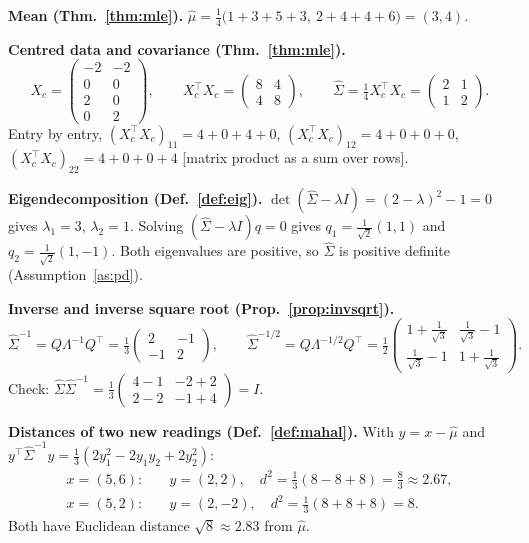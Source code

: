 \documentclass[11pt]{article}
\theoremstyle{definition}
\newcommand{\T}{^{\top}}
\begin{document}
\textbf{Mean (Thm.~\ref{thm:mle}).} $\hat\mu=\tfrac14\big(1+3+5+3,\ 2+4+4+6\big)=(3,4)$.

\textbf{Centred data and covariance (Thm.~\ref{thm:mle}).}
\[
X_c=\begin{pmatrix}-2&-2\\0&0\\2&0\\0&2\end{pmatrix},\qquad
X_c\T X_c=\begin{pmatrix}8&4\\4&8\end{pmatrix},\qquad
\hat\Sigma=\tfrac14X_c\T X_c=\begin{pmatrix}2&1\\1&2\end{pmatrix}.
\]
Entry by entry, $(X_c\T X_c)_{11}=4+0+4+0$, $(X_c\T X_c)_{12}=4+0+0+0$, $(X_c\T X_c)_{22}=4+0+0+4$ [matrix product as a sum over rows].

\textbf{Eigendecomposition (Def.~\ref{def:eig}).} $\det(\hat\Sigma-\lambda I)=(2-\lambda)^2-1=0$ gives $\lambda_1=3$, $\lambda_2=1$. Solving $(\hat\Sigma-\lambda I)q=0$ gives $q_1=\tfrac1{\sqrt2}(1,1)$ and $q_2=\tfrac1{\sqrt2}(1,-1)$. Both eigenvalues are positive, so $\hat\Sigma$ is positive definite (Assumption~\ref{as:pd}).

\textbf{Inverse and inverse square root (Prop.~\ref{prop:invsqrt}).}
\[
\hat\Sigma^{-1}=Q\Lambda^{-1}Q\T=\tfrac13\begin{pmatrix}2&-1\\-1&2\end{pmatrix},\qquad
\hat\Sigma^{-1/2}=Q\Lambda^{-1/2}Q\T=\tfrac12\begin{pmatrix}1+\tfrac1{\sqrt3}&\tfrac1{\sqrt3}-1\\[2pt]\tfrac1{\sqrt3}-1&1+\tfrac1{\sqrt3}\end{pmatrix}.
\]
Check: $\hat\Sigma\hat\Sigma^{-1}=\tfrac13\begin{pmatrix}4-1&-2+2\\2-2&-1+4\end{pmatrix}=I$.

\textbf{Distances of two new readings (Def.~\ref{def:mahal}).} With $y=x-\hat\mu$ and $y\T\hat\Sigma^{-1}y=\tfrac13(2y_1^2-2y_1y_2+2y_2^2)$:
\begin{align*}
x=(5,6):&\quad y=(2,2),\quad d^2=\tfrac13(8-8+8)=\tfrac83\approx2.67,\\
x=(5,2):&\quad y=(2,-2),\quad d^2=\tfrac13(8+8+8)=8.
\end{align*}
Both have Euclidean distance $\sqrt8\approx2.83$ from $\hat\mu$.
\end{document}
